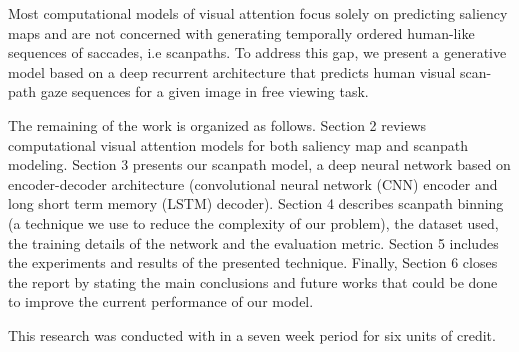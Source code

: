 \documentclass{article} %
\begin{document}
Most computational models of visual attention focus solely on predicting saliency maps and are not concerned with generating temporally ordered human-like sequences of saccades, i.e scanpaths. To address this gap, we present a generative model based on a deep recurrent architecture that
predicts human visual scan-path gaze sequences for a given image in  free viewing task.

The remaining of the work is organized as follows. Section 2 reviews computational visual attention models for both saliency map and scanpath modeling. Section 3 presents our scanpath model, a deep neural network based on encoder-decoder architecture (convolutional neural network (CNN) encoder and long short term memory (LSTM) decoder). Section 4 describes scanpath binning (a technique we use to reduce the complexity of our problem), the dataset used, the training details of the network and the evaluation metric. Section 5 includes the experiments and results of the presented technique. Finally, Section 6 closes the report by stating the main conclusions and future works that could be done to improve the current performance of our model.

This research was conducted with in a seven week period for six units of credit.
\end{document}
